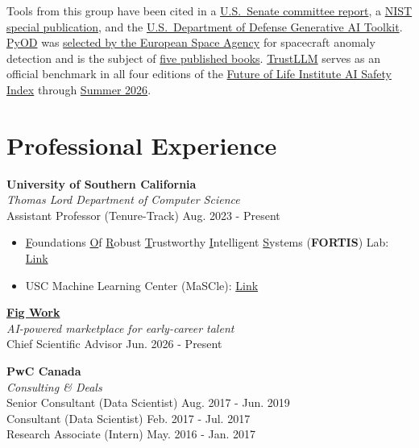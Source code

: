 \documentclass[margin,line,pifont,palatino,courier]{res}
\begin{document}
\begin{resume}
\vspace{0.05in}
{\small
Tools from this group have been cited in a
\href{https://www.hsgac.senate.gov/wp-content/uploads/2024.06.11-Hedge-Fund-Use-of-AI-Report.pdf}{U.S.\ Senate committee report},
a \href{https://nvlpubs.nist.gov/nistpubs/ai/NIST.AI.100-2e2025.pdf}{NIST special publication},
and the \href{https://www.ai.mil/Portals/137/Documents/Resources\%20Page/2024-12GenAI-Responsible-AI-Toolkit.pdf}{U.S.\ Department of Defense Generative AI Toolkit}.
\href{https://github.com/yzhao062/pyod}{PyOD} was
\href{https://www.nature.com/articles/s41597-025-05035-3}{selected by the European Space Agency}
for spacecraft anomaly detection and is the subject of
\href{https://www.manning.com/books/outlier-detection-in-python}{five published books}.
\href{https://github.com/HowieHwong/TrustLLM}{TrustLLM} serves as an official benchmark in all four editions of the
\href{https://futureoflife.org/ai-safety-index-winter-2025/}{Future of Life Institute AI Safety Index}
through \href{https://futureoflife.org/wp-content/uploads/2026/07/AI-Safety-Index-Summer-2026-Digital.pdf}{Summer 2026}.
}

\section{\sc Professional Experience}

\textbf{University of Southern California} \\ 
\textit{Thomas Lord Department of Computer Science} \\
Assistant Professor (Tenure-Track) 
\hfill Aug. 2023 - Present 
\begin{itemize}
    \item {\color{uscred}\underline{F}}oundations {\color{uscred}\underline{O}}f {\color{uscred}\underline{R}}obust {\color{uscred}\underline{T}}rustworthy {\color{uscred}\underline{I}}ntelligent {\color{uscred}\underline{S}}ystems ({\color{uscred}\textbf{FORTIS}}) Lab: \href{https://viterbi-web.usc.edu/~yzhao010/lab.html}{Link}
    \item USC Machine Learning Center (MaSCle): \href{https://mascle.usc.edu/}{Link}
\end{itemize}


\textbf{\href{https://www.figwork.ai/}{Fig Work}} \\
\textit{AI-powered marketplace for early-career talent} \\
Chief Scientific Advisor \hfill Jun. 2026 - Present


\textbf{PwC Canada} \\
\textit{Consulting \& Deals} \\
Senior Consultant (Data Scientist)                                     \hfill Aug. 2017 - Jun. 2019 \\
Consultant (Data Scientist)                                   \hfill Feb. 2017 - Jul. 2017 \\
Research Associate (Intern)                            \hfill May. 2016 - Jan. 2017


\end{resume}
\end{document}
